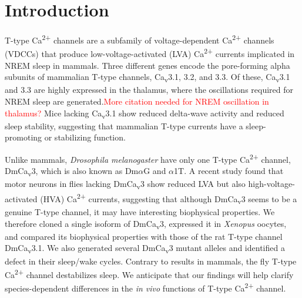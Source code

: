 \section*{Introduction}

T-type Ca\textsuperscript{2+} channels are a subfamily of voltage-dependent Ca\textsuperscript{2+} channels (VDCCs) that produce low-voltage-activated (LVA) Ca\textsuperscript{2+} currents implicated in NREM sleep in mammals\cite{Lee:2004ey}.
Three different genes encode the pore-forming alpha subunits of mammalian T-type channels, Ca\textsubscript{v}3.1, 3.2, and 3.3. Of these, Ca\textsubscript{v}3.1 and 3.3 are highly expressed in the thalamus, where the oscillations required for NREM sleep are generated\cite{PerezReyes:1998gn}.\textcolor{red}{More citation needed for NREM oscillation in thalamus?}
Mice lacking Ca\textsubscript{v}3.1 show reduced delta-wave activity and reduced sleep stability, suggesting that mammalian T-type currents have a sleep-promoting or stabilizing function\cite{Lee:2004ey}.

Unlike mammals, \emph{Drosophila melanogaster} have only one T-type Ca\textsuperscript{2+} channel, DmCa\textsubscript{v}3, which is also known as Dm$\alpha$G and $\alpha$1T.
A recent study found that motor neurons in flies lacking DmCa\textsubscript{v}3 show reduced LVA but also high-voltage-activated (HVA) Ca\textsuperscript{2+} currents, suggesting that although DmCa\textsubscript{v}3 seems to be a genuine T-type channel, it may have interesting biophysical properties\cite{Ryglewski:2012jk}.
We therefore cloned a single isoform of DmCa\textsubscript{v}3,  expressed it in \emph{Xenopus} oocytes, and compared its biophysical properties with those of the rat T-type channel DmCa\textsubscript{v}3.1.
We also generated several DmCa\textsubscript{v}3 mutant alleles and identified a defect in their sleep/wake cycles. Contrary to results in mammals, the fly T-type Ca\textsuperscript{2+} channel destabilizes sleep.
We anticipate that our findings will help clarify species-dependent differences in the \emph{in vivo} functions of T-type Ca\textsuperscript{2+} channel.
    
    
  
  
  
  
  